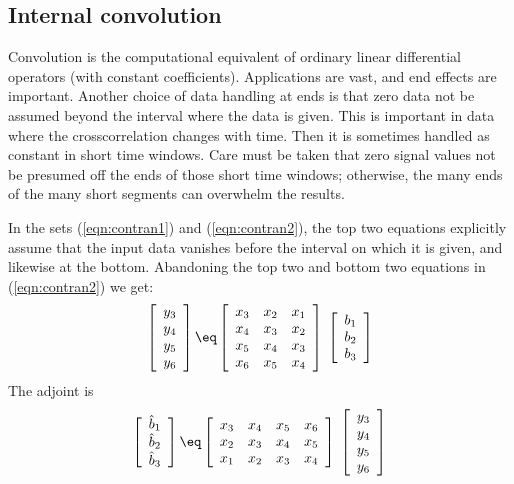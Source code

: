 \subsection{Internal convolution}
Convolution is the computational equivalent of
ordinary linear differential operators (with constant coefficients).
Applications are vast,
and end effects are important.
Another choice of data handling at ends
is that zero data not be assumed
beyond the interval where the data is given.
This is important in data where the crosscorrelation changes with time.
Then it is sometimes handled as constant in short time windows.
Care must be taken that zero signal values not be presumed
off the ends of those short time windows;
otherwise,
the many ends of the many short segments
can overwhelm the results.
\par
In the sets (\ref{eqn:contran1}) and (\ref{eqn:contran2}),
the top two equations explicitly assume that the input data vanishes
before the interval on which it is given, and likewise at the bottom.
Abandoning the top two and bottom two equations in (\ref{eqn:contran2})
we get:
\begin{equation}
\left[ 
\begin{array}{c}
  y_3 \\ 
  y_4 \\ 
  y_5 \\ 
  y_6 
  \end{array} \right] 
\eq
\left[ 
\begin{array}{ccc}
  x_3 & x_2 & x_1  \\
  x_4 & x_3 & x_2  \\
  x_5 & x_4 & x_3  \\
  x_6 & x_5 & x_4 
  \end{array} \right] 
\; \left[ 
\begin{array}{c}
  b_1 \\ 
  b_2 \\ 
  b_3 \end{array} \right]
\label{eqn:trunccontran2}
\end{equation}
The adjoint is
\begin{equation}
\left[ 
\begin{array}{c}
\hat  b_1 \\ 
\hat  b_2 \\ 
\hat  b_3
  \end{array} \right] 
\eq
\left[ 
\begin{array}{ccccc}
  x_3 & x_4 & x_5 & x_6  \\
  x_2 & x_3 & x_4 & x_5  \\
  x_1 & x_2 & x_3 & x_4 
  \end{array} \right] 
\; \left[ 
\begin{array}{c}
  y_3 \\ 
  y_4 \\ 
  y_5 \\ 
  y_6 
  \end{array} \right]
\label{eqn:ajtintcontran2}
\end{equation}
